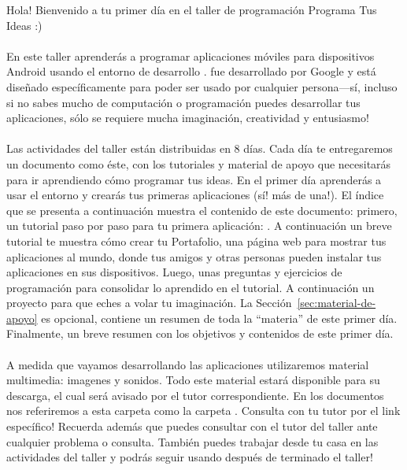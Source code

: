 Hola! Bienvenido a tu primer día en el taller de programación Programa Tus Ideas :)

\paragraph{}
En este taller aprenderás a programar aplicaciones móviles para dispositivos Android usando el entorno de desarrollo \AppInventor. \AppInventor fue desarrollado por Google y está diseñado específicamente para poder ser usado por cualquier persona---sí, incluso si no sabes mucho de computación o programación puedes desarrollar tus aplicaciones, sólo se requiere mucha imaginación, creatividad y entusiasmo!

\paragraph{}
Las actividades del taller están distribuidas en 8 días. Cada día te entregaremos un documento como éste, con los tutoriales y material de apoyo que necesitarás para ir aprendiendo cómo programar tus ideas. En el primer día aprenderás a usar el entorno \AppInventor y crearás tus primeras aplicaciones (sí! más de una!). El índice que se presenta a continuación muestra el contenido de este documento: primero, un tutorial paso por paso para tu primera aplicación: . A continuación un breve tutorial te muestra cómo crear tu Portafolio, una página web para mostrar tus aplicaciones al mundo, donde tus amigos y otras personas pueden instalar tus aplicaciones en sus dispositivos. Luego, unas preguntas y ejercicios de programación para consolidar lo aprendido en el tutorial. A continuación un proyecto para que eches a volar tu imaginación. La Sección~\ref{sec:material-de-apoyo} es opcional, contiene un resumen de toda la ``materia'' de este primer día. Finalmente, un breve resumen con los objetivos y contenidos de este primer día.

\paragraph{}
A medida que vayamos desarrollando las aplicaciones utilizaremos material multimedia: imagenes y sonidos. Todo este material estará disponible para su descarga, el cual será avisado por el tutor correspondiente. En los documentos nos referiremos a esta carpeta como la carpeta . Consulta con tu tutor por el link específico! Recuerda además que puedes consultar con el tutor del taller ante cualquier problema o consulta. También puedes trabajar desde tu casa en las actividades del taller y podrás seguir usando \AppInventor después de terminado el taller!

